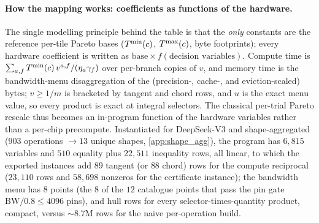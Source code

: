 \paragraph{How the mapping works: coefficients as functions of the hardware.}
The single modelling principle behind the table is that the \emph{only} constants
are the reference per-tile Pareto bases ($T^{\min}(c)$, $T^{\max}(c)$, byte footprints);
every hardware coefficient is written as $\text{base}\times f(\text{decision
variables})$. Compute time is $\sum_{a,f}T^{\min}(c)\,v^{a,f}/(\eta_{a}\gamma_f)$ over
per-branch copies of $v$, and memory time is the bandwidth-menu disaggregation of
the (precision-, cache-, and eviction-scaled) bytes; $v\ge 1/m$ is bracketed by
tangent and chord rows, and $u$ is the exact menu value, so every product is
exact at integral selectors. The classical per-trial Pareto rescale thus becomes
an in-program function of the hardware variables rather than a per-chip
precompute. Instantiated for DeepSeek-V3 and shape-aggregated ($903$ operations
$\to 13$ unique shapes, \cref{app:shape_agg}), the program has
$6{,}815$ variables and $510$ equality plus $22{,}511$ inequality rows, all
linear, to which the exported instances add $89$ tangent (or $88$ chord) rows
for the compute reciprocal ($23{,}110$ rows and $58{,}698$ nonzeros for the
certificate instance); the bandwidth menu has $8$ points (the $8$ of the $12$
catalogue points that pass the pin gate $\mathrm{BW}/0.8\le 4096$ pins), and
hull rows for every selector-times-quantity product, compact, versus
${\sim}8.7$M rows for the naive per-operation build.

